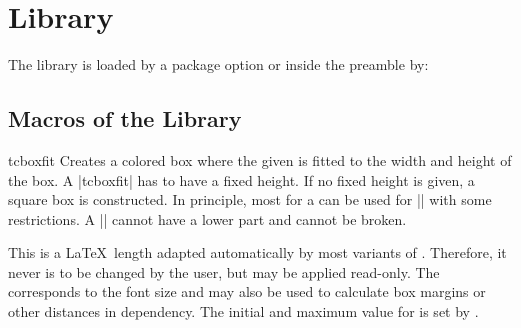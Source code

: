 \clearpage
\section{Library }\label{sec:fitting}%
%
The library is loaded by a package option or inside the preamble by:
\begin{dispListing}
\end{dispListing}

\subsection{Macros of the Library}

\begin{docCommand}{tcboxfit}{}
  Creates a colored box where the given  is fitted to
  the width and height of the box. A |tcboxfit| has to have a fixed height.
  If no fixed height is given, a square box is constructed.
  In principle, most  for a 
  can be used for |\tcboxfit| with some restrictions. A |\tcboxfit| cannot have
  a lower part and cannot be broken.

\enlargethispage*{1cm}
\begin{dispExample}
\begin{tcbraster}[raster columns=3,raster valign=bottom]
  \tcboxfit[height=8cm]{\lipsum[1]}
  \tcboxfit[height=4cm]{\lipsum[1]}
  \tcboxfit[height=2cm]{\lipsum[1]}
\end{tcbraster}
\begin{tcbraster}[colback=green!10!white,boxsep=1mm]
  \tcboxfit[height=4cm]{\lipsum[2]}
  \tcboxfit[height=4cm,title=With a title]{\lipsum[2]}
\end{tcbraster}
\end{dispExample}
\end{docCommand}


\clearpage


\begin{docCommands}[
    doc name        = tcbfitdim,
    doc description = {read-only \LaTeX\ length},
    doc updated     = 2020-04-24,
  ]{}
  This is a \LaTeX\ length adapted automatically by most variants of
  . Therefore, it never is to be
  changed by the user, but may be applied read-only.
  The  corresponds to the font size and may also
  be used to calculate box margins or other distances in dependency.
  The initial and maximum value for  is set by
  .
\end{docCommands}


